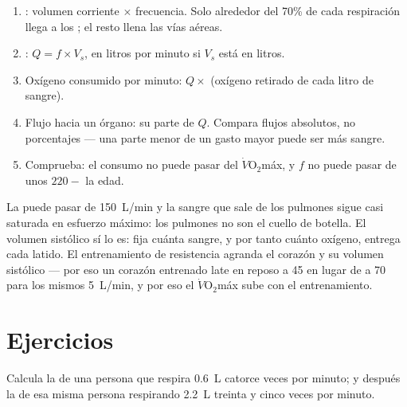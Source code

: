 \begin{method}\label{met:g10:heart-lungs-effort:compute}
\begin{enumerate}
  \item {}: volumen corriente $\times$ frecuencia. Solo
        alrededor del 70\% de cada respiración llega a los ; el
        resto llena las vías aéreas.
  \item {}: $Q = f \times V_s$, en litros por minuto si
        $V_s$ está en litros.
  \item Oxígeno consumido por minuto: $Q \times$ (oxígeno retirado de
        cada litro de sangre).
  \item Flujo hacia un órgano: su parte de $Q$. Compara flujos
        absolutos, no porcentajes --- una parte menor de un gasto mayor
        puede ser más sangre.
  \item Comprueba: el consumo no puede pasar del
        $\dot V\!\mathrm{O_2}$máx, y $f$ no puede pasar de unos
        $220 - $ la edad.
\end{enumerate}
\end{method}

\begin{remark}\label{rem:g10:heart-lungs-effort:limit}
La  puede pasar de \qty{150}{L/min} y la sangre que sale de
los pulmones sigue casi saturada en esfuerzo máximo: los pulmones no
son el cuello de botella. El volumen sistólico sí lo es: fija cuánta
sangre, y por tanto cuánto oxígeno, entrega cada latido. El
entrenamiento de resistencia agranda el corazón y su volumen sistólico
--- por eso un corazón entrenado late en reposo a 45 en lugar de a 70
para los mismos \qty{5}{L/min}, y por eso el
$\dot V\!\mathrm{O_2}$máx sube con el entrenamiento.
\end{remark}

\section{Ejercicios}

\begin{exercise}[$\star$]\label{exo:g10:heart-lungs-effort:1}
Calcula la  de una persona que respira \qty{0.6}{L} catorce
veces por minuto; y después la de esa misma persona respirando
\qty{2.2}{L} treinta y cinco veces por minuto.
\end{exercise}

